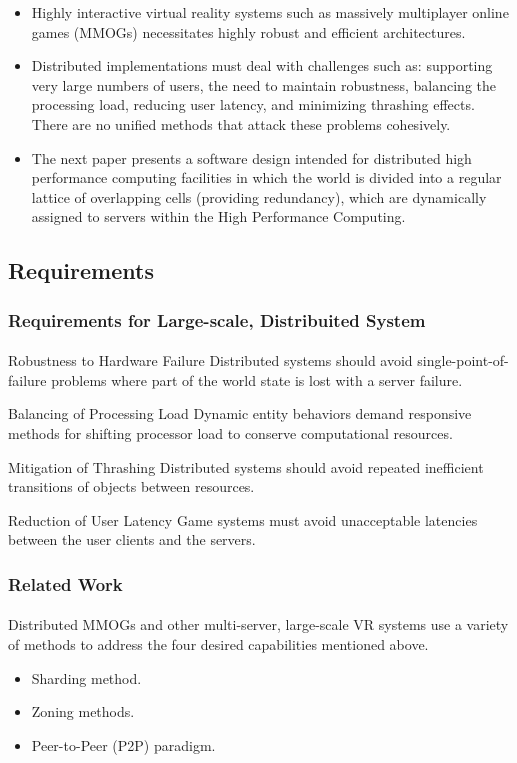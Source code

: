 \begin{frame}
\begin{itemize}[<+->]
\item
Highly interactive virtual reality systems such as massively multiplayer
online games (MMOGs) necessitates highly robust and efficient architectures.
\item
Distributed implementations must deal with challenges such as: supporting very
large numbers of users, the need to maintain robustness, balancing the
processing load, reducing user latency, and minimizing thrashing effects.
There are no unified methods that attack these problems cohesively.
\item
The next paper presents a software design intended for distributed high
performance computing facilities in
which the world is divided into a regular lattice of overlapping
cells (providing redundancy), which are dynamically assigned to
servers within the High Performance Computing.
\end{itemize}
\end{frame}

\subsection{Requirements}

\begin{frame}
\frametitle{Requirements for Large-scale, Distribuited System}
\framesubtitle{}
\begin{block}{Robustness to Hardware Failure}
Distributed systems
should avoid single-point-of-failure problems where part of the
world state is lost with a server failure.
\end{block}
\pause
\begin{block}{Balancing of Processing Load}
Dynamic entity behaviors
demand responsive methods for shifting processor load to
conserve computational resources.
\end{block}
\pause
\begin{block}{Mitigation of Thrashing}
Distributed systems should avoid
repeated inefficient transitions of objects between resources.
\end{block}
\pause
\begin{block}{Reduction of User Latency}
Game systems must avoid
unacceptable latencies between the user clients and the servers.
\end{block}
\end{frame}

\begin{frame}
\frametitle{Related Work}
\framesubtitle{}
Distributed MMOGs and other multi-server, large-scale VR
systems use a variety of methods to address the four desired
capabilities mentioned above.
\begin{itemize}
\item<2->
Sharding method.
\item<3->
Zoning methods.
\item<4->
Peer-to-Peer (P2P) paradigm.
\end{itemize}
\end{frame}

